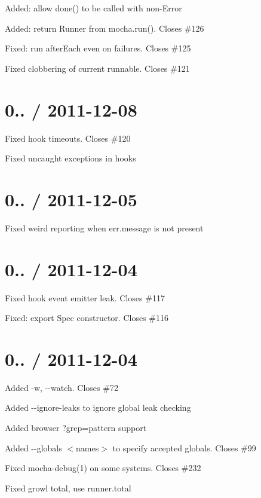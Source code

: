 \begin{DoxyItemize}
\item Added\+: allow {\ttfamily done()} to be called with non-\/\+Error
\item Added\+: return Runner from {\ttfamily mocha.\+run()}. Closes \#126
\item Fixed\+: run after\+Each even on failures. Closes \#125
\item Fixed clobbering of current runnable. Closes \#121
\end{DoxyItemize}

\section*{0.. / 2011-\/12-\/08}


\begin{DoxyItemize}
\item Fixed hook timeouts. Closes \#120
\item Fixed uncaught exceptions in hooks
\end{DoxyItemize}

\section*{0.. / 2011-\/12-\/05}


\begin{DoxyItemize}
\item Fixed weird reporting when {\ttfamily err.\+message} is not present
\end{DoxyItemize}

\section*{0.. / 2011-\/12-\/04}


\begin{DoxyItemize}
\item Fixed hook event emitter leak. Closes \#117
\item Fixed\+: export {\ttfamily Spec} constructor. Closes \#116
\end{DoxyItemize}

\section*{0.. / 2011-\/12-\/04}


\begin{DoxyItemize}
\item Added {\ttfamily -\/w, -\/-\/watch}. Closes \#72
\item Added {\ttfamily -\/-\/ignore-\/leaks} to ignore global leak checking
\item Added browser {\ttfamily ?grep=pattern} support
\item Added {\ttfamily -\/-\/globals $<$names$>$} to specify accepted globals. Closes \#99
\item Fixed {\ttfamily mocha-\/debug(1)} on some systems. Closes \#232
\item Fixed growl total, use {\ttfamily runner.\+total}
\end{DoxyItemize}

